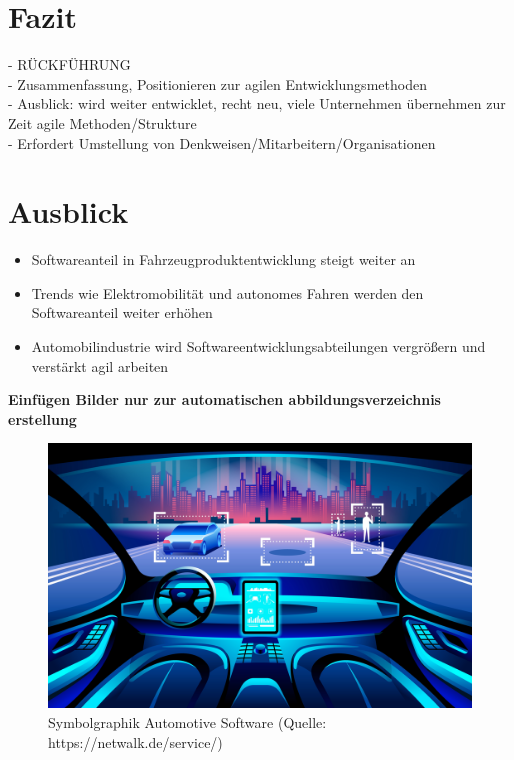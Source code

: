  \cite{anjum2020agile}

\section{Fazit}
- RÜCKFÜHRUNG\\
- Zusammenfassung, Positionieren zur agilen Entwicklungsmethoden \\
- Ausblick: wird weiter entwicklet, recht neu, viele Unternehmen übernehmen zur Zeit agile Methoden/Strukture \\
- Erfordert Umstellung von Denkweisen/Mitarbeitern/Organisationen\\

\section{Ausblick}
\begin{itemize}
	\item Softwareanteil in Fahrzeugproduktentwicklung steigt weiter an
	\item Trends wie Elektromobilität und autonomes Fahren werden den Softwareanteil weiter erhöhen
	\item Automobilindustrie wird Softwareentwicklungsabteilungen vergrößern und verstärkt agil arbeiten
\end{itemize}

\newpage
\listoffigures
\textbf{Einfügen Bilder nur zur automatischen abbildungsverzeichnis erstellung}
\begin{figure}[htb]
	\centering
	\includegraphics[width=\textwidth]{img/titelbild.jpg}
	\caption[Symbolgraphik Automotive Software (Quelle: https://netwalk.de/service/)]{Symbolgraphik Automotive Software (Quelle: https://netwalk.de/service/)}
	\label{fig:titelbild}
\end{figure}

